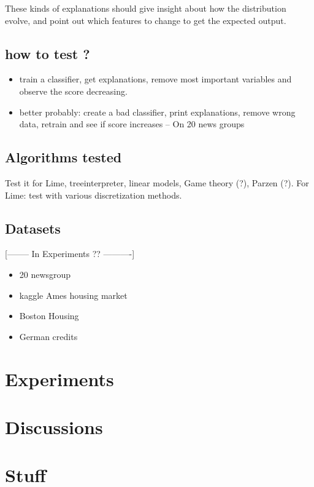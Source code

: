 \documentclass[a4paper,11pt]{kth-mag}
\begin{document}
These kinds of explanations should give insight about how the distribution evolve, and point out which features to change to get the expected output.


\section{how to test ?}

\begin{itemize}
	\item train a classifier, get explanations, remove most important variables and observe the score decreasing.
    \item better probably: create a bad classifier, print explanations, remove wrong data, retrain and see if score increases -- On 20 news groups
\end{itemize}

\section{Algorithms tested}

Test it for Lime, treeinterpreter, linear models, Game theory (?), Parzen (?). For Lime: test with various discretization methods.

\section{Datasets}

[-------- In Experiments ?? ----------]
\begin{itemize}
    \item 20 newsgroup
    \item kaggle Ames housing market
    \item Boston Housing
    \item German credits
\end{itemize}

\chapter{Experiments}

\chapter{Discussions}




\chapter{Stuff}
\end{document}
